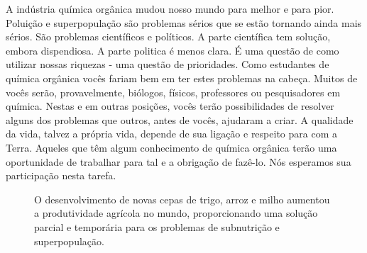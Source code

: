 A indústria química orgânica mudou nosso mundo para melhor e para pior. Poluição e superpopulação são problemas sérios que se estão tornando ainda mais sérios. São problemas científicos e políticos. A parte científica tem solução, embora dispendiosa. A parte politica é menos clara. É uma questão de como utilizar nossas riquezas - uma questão de prioridades. Como estudantes de química orgânica vocês fariam bem em ter estes problemas na cabeça. Muitos de vocês serão, provavelmente, biólogos, físicos, professores ou pesquisadores em química. Nestas e em outras posições, vocês terão possibilidades de resolver alguns dos problemas que outros, antes de vocês, ajudaram a criar. A qualidade da vida, talvez a própria vida, depende de sua ligação e respeito para com a Terra. Aqueles que têm algum conhecimento de química orgânica terão uma oportunidade de trabalhar para tal e a obrigação de fazê-lo. Nós esperamos sua participação nesta tarefa. 
\begin{figure}[htbp]
    \centering
    \caption{O desenvolvimento de novas cepas de trigo, arroz e milho aumentou a produtividade agrícola no mundo, proporcionando uma solução parcial e temporária para os problemas de subnutrição e superpopulação.}
    \label{fig1_5}
\end{figure}